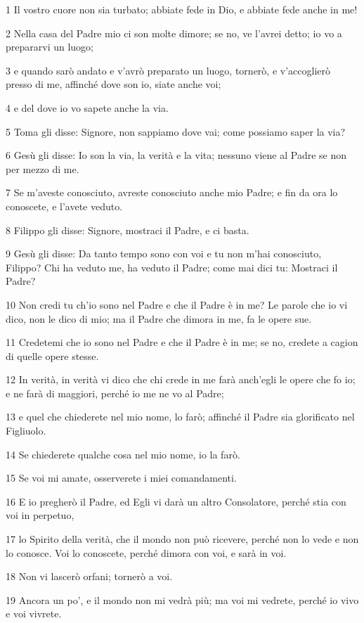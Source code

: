\par 1 Il vostro cuore non sia turbato; abbiate fede in Dio, e abbiate fede anche in me!
\par 2 Nella casa del Padre mio ci son molte dimore; se no, ve l'avrei detto; io vo a prepararvi un luogo;
\par 3 e quando sarò andato e v'avrò preparato un luogo, tornerò, e v'accoglierò presso di me, affinché dove son io, siate anche voi;
\par 4 e del dove io vo sapete anche la via.
\par 5 Toma gli disse: Signore, non sappiamo dove vai; come possiamo saper la via?
\par 6 Gesù gli disse: Io son la via, la verità e la vita; nessuno viene al Padre se non per mezzo di me.
\par 7 Se m'aveste conosciuto, avreste conosciuto anche mio Padre; e fin da ora lo conoscete, e l'avete veduto.
\par 8 Filippo gli disse: Signore, mostraci il Padre, e ci basta.
\par 9 Gesù gli disse: Da tanto tempo sono con voi e tu non m'hai conosciuto, Filippo? Chi ha veduto me, ha veduto il Padre; come mai dici tu: Mostraci il Padre?
\par 10 Non credi tu ch'io sono nel Padre e che il Padre è in me? Le parole che io vi dico, non le dico di mio; ma il Padre che dimora in me, fa le opere sue.
\par 11 Credetemi che io sono nel Padre e che il Padre è in me; se no, credete a cagion di quelle opere stesse.
\par 12 In verità, in verità vi dico che chi crede in me farà anch'egli le opere che fo io; e ne farà di maggiori, perché io me ne vo al Padre;
\par 13 e quel che chiederete nel mio nome, lo farò; affinché il Padre sia glorificato nel Figliuolo.
\par 14 Se chiederete qualche cosa nel mio nome, io la farò.
\par 15 Se voi mi amate, osserverete i miei comandamenti.
\par 16 E io pregherò il Padre, ed Egli vi darà un altro Consolatore, perché stia con voi in perpetuo,
\par 17 lo Spirito della verità, che il mondo non può ricevere, perché non lo vede e non lo conosce. Voi lo conoscete, perché dimora con voi, e sarà in voi.
\par 18 Non vi lascerò orfani; tornerò a voi.
\par 19 Ancora un po', e il mondo non mi vedrà più; ma voi mi vedrete, perché io vivo e voi vivrete.
